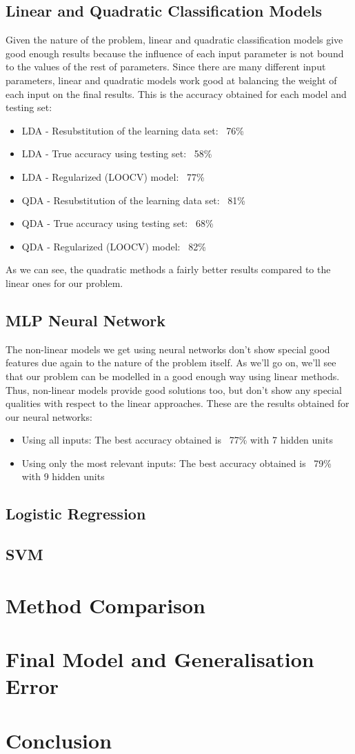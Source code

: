 \documentclass[english]{scrartcl}
\begin{document}
    \subsection{Linear and Quadratic Classification Models}
    Given the nature of the problem, linear and quadratic classification models give good enough results because the influence
    of each input parameter is not bound to the values of the rest of parameters. Since there are many different input parameters,
    linear and quadratic models work good at balancing the weight of each input on the final results. This is the accuracy
    obtained for each model and testing set:
    \begin{itemize}
    \item LDA - Resubstitution of the learning data set: ~76\%
    \item LDA - True accuracy using testing set: ~58\%
    \item LDA - Regularized (LOOCV) model: ~77\%
    \item QDA - Resubstitution of the learning data set: ~81\%
    \item QDA - True accuracy using testing set: ~68\%
    \item QDA - Regularized (LOOCV) model: ~82\%
    \end{itemize}
    As we can see, the quadratic methods a fairly better results compared to the linear ones for our problem.
    
    \subsection{MLP Neural Network}\label{sec:results:nnet}
    The non-linear models we get using neural networks don't show special good features due again to the nature of the problem itself.
    As we'll go on, we'll see that our problem can be modelled in a good enough way using linear methods. Thus, non-linear models provide
    good solutions too, but don't show any special qualities with respect to the linear approaches. These are the results obtained for
    our neural networks:
    \begin{itemize}
    \item Using all inputs: The best accuracy obtained is ~77\% with 7 hidden units
    \item Using only the most relevant inputs: The best accuracy obtained is ~79\% with 9 hidden units
    \end{itemize}
    
    \subsection{Logistic Regression}
    
    \subsection{SVM}

\section{Method Comparison}

\section{Final Model and Generalisation Error}

\section{Conclusion}
\end{document}
